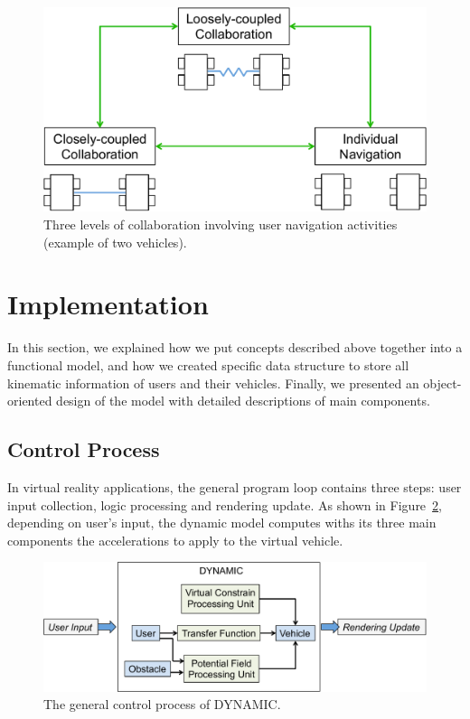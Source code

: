 \begin{figure}[htb]
  \centering
  \includegraphics[width=.8\textwidth]{figures/ch5/user_inter}
  \caption{\label{fig:5_user_inter}Three levels of collaboration involving user navigation activities (example of two vehicles).}
\end{figure}



\section{Implementation}
In this section, we explained how we put concepts described above together into a functional model, and how we created specific data structure to store all kinematic information of users and their vehicles. Finally, we presented an object-oriented design of the model with detailed descriptions of main components.

\subsection{Control Process}
In virtual reality applications, the general program loop contains three steps: user input collection, logic processing and rendering update. As shown in Figure~\ref{fig:5_process}, depending on user's input, the dynamic model computes withs its three main components the accelerations to apply to the virtual vehicle.

\begin{figure}[htb]
  \centering
  \includegraphics[width=.9\textwidth]{figures/ch5/process}
  \caption{\label{fig:5_process}The general control process of DYNAMIC.}
\end{figure}

